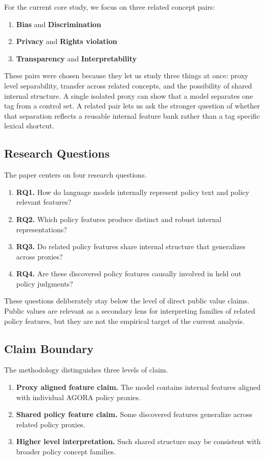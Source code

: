 ﻿\documentclass{article}
\begin{document}
For the current core study, we focus on three related concept pairs:
\begin{enumerate}
    \item \textbf{Bias} and \textbf{Discrimination}
    \item \textbf{Privacy} and \textbf{Rights violation}
    \item \textbf{Transparency} and \textbf{Interpretability}
\end{enumerate}

These pairs were chosen because they let us study three things at once: proxy level separability, transfer across related concepts, and the possibility of shared internal structure. A single isolated proxy can show that a model separates one tag from a control set. A related pair lets us ask the stronger question of whether that separation reflects a reusable internal feature bank rather than a tag specific lexical shortcut.

\subsection{Research Questions}
The paper centers on four research questions.
\begin{enumerate}
    \item \textbf{RQ1.} How do language models internally represent policy text and policy relevant features?
    \item \textbf{RQ2.} Which policy features produce distinct and robust internal representations?
    \item \textbf{RQ3.} Do related policy features share internal structure that generalizes across proxies?
    \item \textbf{RQ4.} Are these discovered policy features causally involved in held out policy judgments?
\end{enumerate}

These questions deliberately stay below the level of direct public value claims. Public values are relevant as a secondary lens for interpreting families of related policy features, but they are not the empirical target of the current analysis.

\subsection{Claim Boundary}
The methodology distinguishes three levels of claim.
\begin{enumerate}
    \item \textbf{Proxy aligned feature claim.} The model contains internal features aligned with individual AGORA policy proxies.
    \item \textbf{Shared policy feature claim.} Some discovered features generalize across related policy proxies.
    \item \textbf{Higher level interpretation.} Such shared structure may be consistent with broader policy concept families.
\end{enumerate}
\end{document}

